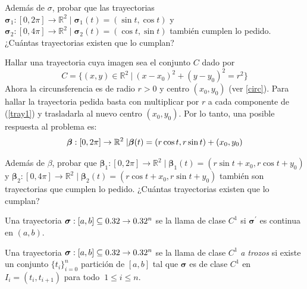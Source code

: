 \begin{tarea}\label{obs1}Adem\'as de $\sigma$, probar que las trayectorias  $ \boldsymbol{\sigma}_{1}:[0,2\pi]\rightarrow\mathbb{R}^2\;|\;\boldsymbol{\sigma}_{1}(t)=(\sin{t},\cos{t} )$   y $ \boldsymbol{\sigma}_{2}:[0,4\pi]\rightarrow\mathbb{R}^2\;|\;\boldsymbol{\sigma}_{2}(t)=(\cos{t}, \sin{t} )$ tambi\'en  cumplen lo pedido.   ¿Cu\'antas trayectorias existen que lo cumplan?  
 \end{tarea}       
  
  
          \begin{example}     Hallar una trayectoria cuya imagen sea el conjunto $C$ dado por
          \begin{equation}  
    C = \{  (x,y)  \in \mathbb{R}^2 \:|\:   (x-x_0)^2+(y-y_0)^2=r^2 \} \label{ej}
    \end{equation} 
     Ahora la circunsferencia es de radio $r> 0$ y centro $(x_0,y_0)$  (ver \ref{circ}). Para hallar la trayectoria pedida basta con multiplicar por $r$ a cada componente de (\ref{tray1})  y trasladarla al nuevo centro $(x_0,y_0)$.  Por lo tanto,  una posible respuesta al problema es:
        \begin{equation*}
            \boldsymbol{\beta}:[0,2\pi] \rightarrow\mathbb{R}^2\;|\;\\ \boldsymbol{\beta}(t)=(r\cos{t},r\sin{t}) + (x_0,y_0)
        \end{equation*} 
     \end{example}    
 
 \begin{tarea}\label{obs2} Adem\'as de $\beta$, probar que $ \boldsymbol{\beta}_{1}:[0,2\pi]\rightarrow\mathbb{R}^2\;|\;\boldsymbol{\beta}_{1}(t)=(r\sin{t}+x_0,r\cos{t}+y_0 )$   y $ \boldsymbol{\beta}_{2}:[0,4\pi]\rightarrow\mathbb{R}^2\;|\;\boldsymbol{\beta}_{2}(t)=(r\cos{t}+x_0, r\sin{t}+y_0 )$ tambi\'en son trayectorias que cumplen lo pedido. ¿Cu\'antas trayectorias existen que lo cumplan?  
 \end{tarea}       
     
     
 \begin{definition}\label{def:a}
 Una trayectoria $\boldsymbol{\sigma}:[a,b]\subseteq0.32\to0.32^n$ se la llama de clase $C^1$  si $\boldsymbol{\sigma}^{\prime}$ es continua en $(a,b)$. 
\end{definition}     
     
 \begin{definition}\label{def:a-trozos}
 Una trayectoria $\boldsymbol{\sigma}:[a,b]\subseteq0.32\to0.32^n$ se la llama de clase $C^1$ \emph{a trozos} si existe un conjunto $\{t_i\}_{i=0}^n$ partici\'on de $[a,b]$ tal que $\boldsymbol{\sigma}$ es de clase $C^{1}$ en $I_i=(t_i, t_{i+1})$ para todo $\:1\leq i \leq n$.
\end{definition}
   
